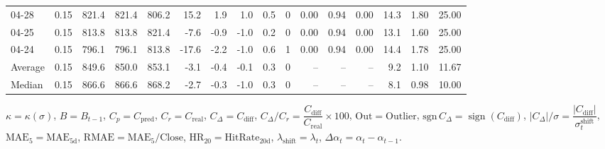\begin{threeparttable}
{\begin{tabular}{lrrrrrrrrrrrrrrr}
  04-28 &     0.15 & 821.4 & 821.4 & 806.2 &       15.2 &            1.9 &                      1.0 &                 0.5 &              0 &       0.00 &      0.94 &           0.00 &             14.3 &            1.80 &                  25.00 \\
  04-25 &     0.15 & 813.8 & 813.8 & 821.4 &       -7.6 &           -0.9 &                     -1.0 &                 0.2 &              0 &       0.00 &      0.94 &           0.00 &             13.1 &            1.60 &                  25.00 \\
  04-24 &     0.15 & 796.1 & 796.1 & 813.8 &      -17.6 &           -2.2 &                     -1.0 &                 0.6 &              1 &       0.00 &      0.94 &           0.00 &             14.4 &            1.78 &                  25.00 \\
Average &     0.15 & 849.6 & 850.0 & 853.1 &       -3.1 &           -0.4 &                     -0.1 &                 0.3 &              0 &         -- &        -- &             -- &              9.2 &            1.10 &                  11.67 \\
 Median &     0.15 & 866.6 & 866.6 & 868.2 &       -2.7 &           -0.3 &                     -1.0 &                 0.3 &              0 &         -- &        -- &             -- &              8.1 &            0.98 &                  10.00 \\
\bottomrule
\end{tabular}
}
\begin{tablenotes}\footnotesize
\item $\kappa=\kappa(\sigma)$, $B=B_{t-1}$, $C_p=C_{\text{pred}}$, $C_r=C_{\text{real}}$, $C_\Delta=C_{\text{diff}}$, $C_\Delta/C_r=\dfrac{C_{\text{diff}}}{C_{\text{real}}}\times100$, $\mathrm{Out}=\text{Outlier}$, $\mathrm{sgn}\,C_\Delta=\operatorname{sign}(C_{\text{diff}})$, $|C_\Delta|/\sigma=\dfrac{|C_{\text{diff}}|}{\sigma_t^{\text{shift}}}$, $\mathrm{MAE}_5=\mathrm{MAE}_{5\text{d}}$, $\mathrm{RMAE}= \mathrm{MAE}_5 / \text{Close}$, $\mathrm{HR}_{20}=\mathrm{HitRate}_{20\text{d}}$, 
$\lambda_{\text{shift}}=\lambda_t$, 
$\Delta\alpha_t=\alpha_t-\alpha_{t-1}$.
\end{tablenotes}
\end{threeparttable}
\endgroup

